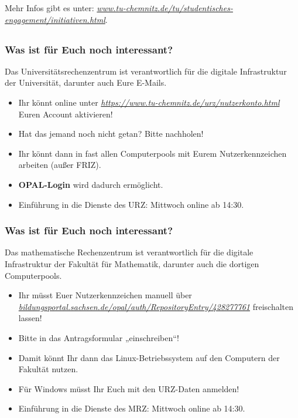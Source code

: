 \documentclass[10pt]{beamer}
\makeatletter
\newcommand{\highl}[1]{\color{tuccolor@ma}#1\color{black}}
\makeatother
\begin{document}
\begin{frame}
	\vspace*{3.8cm}

	Mehr Infos gibt es unter: \highl{\textit{\href{https://www.tu-chemnitz.de/tu/studentisches-engagement/initiativen.html}{www.tu-chemnitz.de/tu/studentisches-engagement/initiativen.html}}}.
\end{frame}

\subsection*{ }

\begin{frame}
	\frametitle{Was ist für Euch noch interessant?}

	\begin{block}{\vphantom{X}}
		Das Universitätsrechenzentrum ist verantwortlich für die digitale Infrastruktur der Universität, darunter auch Eure E-Mails.
	\end{block}

	\begin{itemize}
		\item Ihr könnt online unter \highl{\textit{\href{https://www.tu-chemnitz.de/urz/nutzerkonto.html}{https://www.tu-chemnitz.de/urz/nutzerkonto.html}}}  Euren Account aktivieren!
		\item Hat das jemand noch nicht getan? Bitte nachholen!
		\item Ihr könnt dann in fast allen Computerpools mit Eurem Nutzerkennzeichen arbeiten (außer FRIZ).
		\item \textbf{OPAL-Login} wird dadurch ermöglicht.
		\item Einführung in die Dienste des URZ: Mittwoch online ab 14:30.
	\end{itemize}
\end{frame}

\begin{frame}
	\frametitle{Was ist für Euch noch interessant?}

	\begin{block}{\vphantom{X}}
		Das mathematische Rechenzentrum ist verantwortlich für die digitale Infrastruktur der Fakultät für Mathematik, darunter auch die dortigen Computerpools.
	\end{block}

	\begin{itemize}
		\item Ihr müsst Euer Nutzerkennzeichen manuell über \highl{\textit{\href{https://bildungsportal.sachsen.de/opal/auth/RepositoryEntry/428277761}{bildungsportal.sachsen.de/opal/auth/RepositoryEntry/428277761}} }freischalten lassen!
		\item Bitte in das Antragsformular „einschreiben“!
		\item Damit könnt Ihr dann das Linux-Betriebssystem auf den Computern der Fakultät nutzen.
		\item Für Windows müsst Ihr Euch mit den URZ-Daten anmelden! 
		\item Einführung in die Dienste des MRZ: Mittwoch online ab 14:30.
	\end{itemize}
\end{frame}
\end{document}
